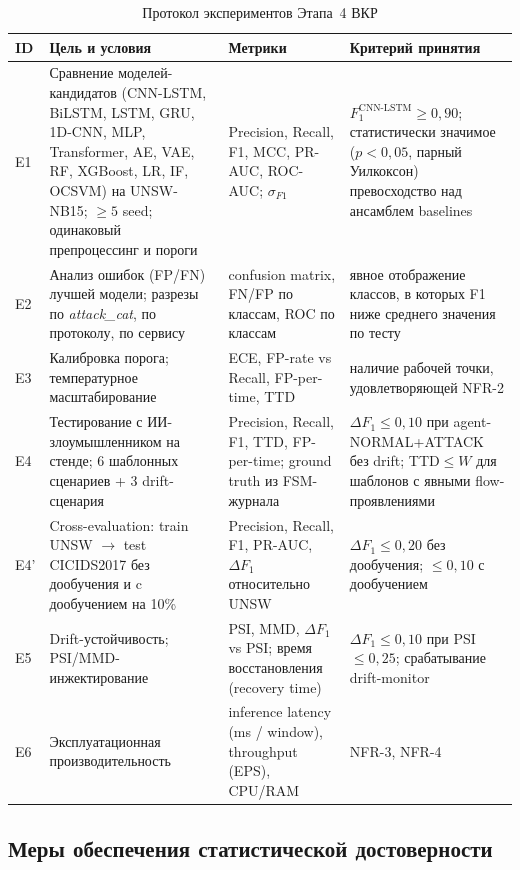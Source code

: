 \begin{table}[H]
\centering
\caption{Протокол экспериментов Этапа~4 ВКР}
\label{tab:experiments}
\renewcommand{\arraystretch}{1.25}
\setlength{\tabcolsep}{4pt}
\small
\begin{tabularx}{\linewidth}{@{}lXXX@{}}
\toprule
\textbf{ID} & \textbf{Цель и условия} & \textbf{Метрики} & \textbf{Критерий принятия} \\
\midrule
E1 &
Сравнение моделей-кандидатов (CNN-LSTM, BiLSTM, LSTM, GRU, 1D-CNN, MLP,
Transformer, AE, VAE, RF, XGBoost, LR, IF, OCSVM) на UNSW-NB15;
\(\geq 5\) seed; одинаковый препроцессинг и пороги &
Precision, Recall, F1, MCC, PR-AUC, ROC-AUC; \(\sigma_{F1}\) &
\(F_1^{\text{CNN-LSTM}} \geq 0{,}90\); статистически значимое
($p < 0{,}05$, парный Уилкоксон) превосходство над ансамблем baselines \\
\addlinespace
E2 &
Анализ ошибок (FP/FN) лучшей модели; разрезы по \emph{attack\_cat},
по протоколу, по сервису &
confusion matrix, FN/FP по классам, ROC по классам &
явное отображение классов, в которых F1 ниже среднего значения по тесту \\
\addlinespace
E3 &
Калибровка порога; температурное масштабирование &
ECE, FP-rate vs Recall, FP-per-time, TTD &
наличие рабочей точки, удовлетворяющей NFR-2 \\
\addlinespace
E4 &
Тестирование с ИИ-злоумышленником на стенде; 6 шаблонных сценариев
+ 3 drift-сценария &
Precision, Recall, F1, TTD, FP-per-time;
ground truth из FSM-журнала &
\(\Delta F_1 \leq 0{,}10\) при agent-NORMAL+ATTACK без drift; TTD$\leq W$
для шаблонов с явными flow-проявлениями \\
\addlinespace
E4' &
Cross-evaluation: train UNSW $\to$ test CICIDS2017
без дообучения и c дообучением на 10\% &
Precision, Recall, F1, PR-AUC, $\Delta F_1$ относительно UNSW &
$\Delta F_1 \leq 0{,}20$ без дообучения; $\leq 0{,}10$ с дообучением \\
\addlinespace
E5 &
Drift-устойчивость; PSI/MMD-инжектирование &
PSI, MMD, $\Delta F_1$ vs PSI; время восстановления (recovery time) &
$\Delta F_1 \leq 0{,}10$ при PSI $\leq 0{,}25$; срабатывание
drift-monitor \\
\addlinespace
E6 &
Эксплуатационная производительность &
inference latency (ms / window),
throughput (EPS), CPU/RAM &
NFR-3, NFR-4 \\
\bottomrule
\end{tabularx}
\end{table}

\subsection{Меры обеспечения статистической достоверности}


